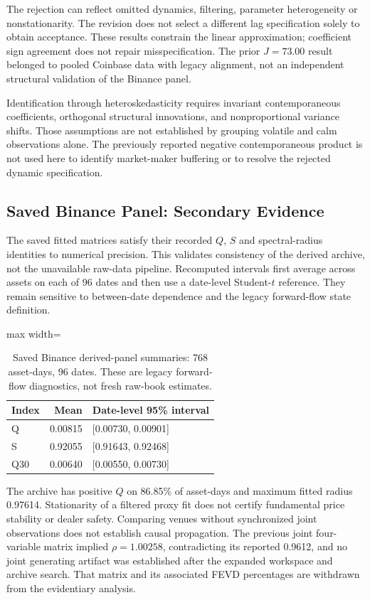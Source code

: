 \documentclass[12pt]{article}
\theoremstyle{definition}
\theoremstyle{remark}
\begin{document}
The rejection can reflect omitted dynamics, filtering, parameter heterogeneity or nonstationarity. The revision does not select a different lag specification solely to obtain acceptance. These results constrain the linear approximation; coefficient sign agreement does not repair misspecification. The prior $J=73.00$ result belonged to pooled Coinbase data with legacy alignment, not an independent structural validation of the Binance panel.

Identification through heteroskedasticity requires invariant contemporaneous coefficients, orthogonal structural innovations, and nonproportional variance shifts. Those assumptions are not established by grouping volatile and calm observations alone. The previously reported negative contemporaneous product is not used here to identify market-maker buffering or to resolve the rejected dynamic specification.

\subsection{Saved Binance Panel: Secondary Evidence}
The saved fitted matrices satisfy their recorded $Q$, $S$ and spectral-radius identities to numerical precision. This validates consistency of the derived archive, not the unavailable raw-data pipeline. Recomputed intervals first average across assets on each of 96 dates and then use a date-level Student-$t$ reference. They remain sensitive to between-date dependence and the legacy forward-flow state definition.

\begin{table}[htbp]
\centering\small
\caption{Saved Binance derived-panel summaries: 768 asset-days, 96 dates. These are legacy forward-flow diagnostics, not fresh raw-book estimates.}
\label{tab:panel_revised}
\begin{adjustbox}{max width=\textwidth}
\begin{tabular}{lrl}\toprule
Index & Mean & Date-level 95\% interval \\\midrule
Q & 0.00815 & [0.00730, 0.00901] \\
S & 0.92055 & [0.91643, 0.92468] \\
Q30 & 0.00640 & [0.00550, 0.00730] \\
\bottomrule\end{tabular}
\end{adjustbox}
\end{table}

The archive has positive $Q$ on 86.85\% of asset-days and maximum fitted radius 0.97614. Stationarity of a filtered proxy fit does not certify fundamental price stability or dealer safety. Comparing venues without synchronized joint observations does not establish causal propagation. The previous joint four-variable matrix implied $\rho=1.00258$, contradicting its reported 0.9612, and no joint generating artifact was established after the expanded workspace and archive search. That matrix and its associated FEVD percentages are withdrawn from the evidentiary analysis.
\end{document}
